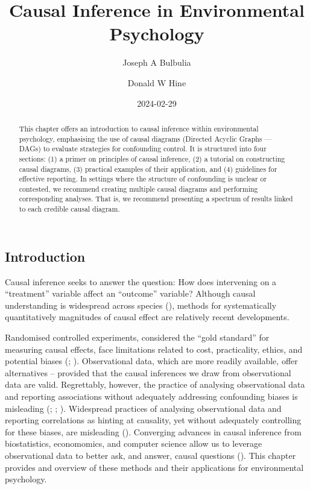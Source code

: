 \documentclass[
  singlecolumn]{article}
\title{Causal Inference in Environmental Psychology}
\author{Joseph A Bulbulia \and Donald W Hine}
\date{2024-02-29}
\begin{document}
\maketitle
\begin{abstract}
This chapter offers an introduction to causal inference within
environmental psychology, emphasising the use of causal diagrams
(Directed Acyclic Graphs --- DAGs) to evaluate strategies for
confounding control. It is structured into four sections: (1) a primer
on principles of causal inference, (2) a tutorial on constructing causal
diagrams, (3) practical examples of their application, and (4)
guidelines for effective reporting. In settings where the structure of
confounding is unclear or contested, we recommend creating multiple
causal diagrams and performing corresponding analyses. That is, we
recommend presenting a spectrum of results linked to each credible
causal diagram.
\end{abstract}

\subsection{Introduction}\label{introduction}

Causal inference seeks to answer the question: How does intervening on a
``treatment'' variable affect an ``outcome'' variable? Although causal
understanding is widespread across species
(), methods for
systematically quantitatively magnitudes of causal effect are relatively
recent developments.

Randomised controlled experiments, considered the ``gold standard'' for
measuring causal effects, face limitations related to cost,
practicality, ethics, and potential biases
(;
).
Observational data, which are more readily available, offer alternatives
-- provided that the causal inferences we draw from observational data
are valid. Regrettably, however, the practice of analysing observational
data and reporting associations without adequately addressing
confounding biases is misleading (; ;
). Widespread
practices of analysing observational data and reporting correlations as
hinting at causality, yet without adequately controlling for these
biases, are misleading (). Converging advances in causal inference from biostatistics,
economomics, and computer science allow us to leverage observational
data to better ask, and answer, causal questions
(). This chapter
provides and overview of these methods and their applications for
environmental psychology.
\end{document}
